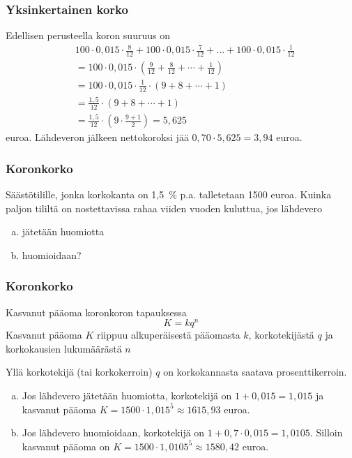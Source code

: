 \documentclass{beamer}
\begin{document}
\begin{frame}
\frametitle{Yksinkertainen korko}
	\begin{ratkaisu}		
		Edellisen perusteella koron suuruus on 
		\begin{align*}
			&100\cdot0,015\cdot\frac{8}{12}+100\cdot0,015\cdot\frac{7}{12}+\ldots+100\cdot0,015\cdot\frac{1}{12} \\
			&= 100\cdot0,015\cdot\left(\frac{9}{12} + \frac{8}{12} + \cdots +\frac{1}{12}\right)\\
			&= 100\cdot0,015\cdot\frac{1}{12}\cdot(9+8+\cdots+1)\\
			&= \frac{1,5}{12}\cdot(9+8+\cdots+1)\\
			&= \frac{1,5}{12}\cdot\left( 9\cdot\frac{9+1}{2}\right) = 5,625
		\end{align*}
		euroa. Lähdeveron jälkeen nettokoroksi jää \(0,70\cdot5,625=3,94\) euroa.
	\end{ratkaisu}
\end{frame}

\begin{frame}
\frametitle{Koronkorko}
	\begin{esim}
		Säästötilille, jonka korkokanta on 1,5~\% p.a. talletetaan 1500 euroa.
		Kuinka paljon tililtä on nostettavissa rahaa viiden vuoden kuluttua, jos lähdevero
		\begin{enumerate}[(a)]
			\item jätetään huomiotta
			\item huomioidaan?
		\end{enumerate}
	\end{esim}
\end{frame}

\begin{frame}
\frametitle{Koronkorko}
	\begin{block}{Kasvanut pääoma koronkoron tapauksessa}
		\[
			K = kq^n
		\]
		Kasvanut pääoma \(K\) riippuu alkuperäisestä pääomasta \(k\), korkotekijästä \(q\) ja korkokausien lukumäärästä \(n\)
	\end{block}
	Yllä korkotekijä (tai korkokerroin) \(q\) on korkokannasta saatava prosenttikerroin.
\end{frame}

\begin{frame}
 	\begin{ratkaisu}
 		\begin{enumerate}[(a)]
 			\item Jos lähdevero jätetään huomiotta, korkotekijä on \(1+ 0,015 = 1,015\) ja kasvanut pääoma
 			\(K=1500\cdot1,015^5\approx 1615,93\) euroa.
 			\item Jos lähdevero huomioidaan, korkotekijä on \(1+0,7\cdot0,015=	1,0105\). Silloin kasvanut pääoma on
 			\(K=1500\cdot1,0105^5\approx	1580,42\) euroa.
 		\end{enumerate}
 	\end{ratkaisu}
\end{frame}
\end{document}
